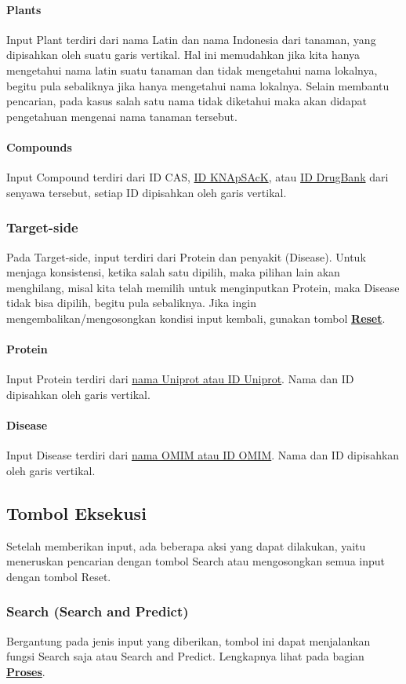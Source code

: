 			\paragraph{Plants}
			Input Plant terdiri dari nama Latin dan nama Indonesia dari tanaman, yang dipisahkan oleh suatu garis vertikal. Hal ini memudahkan jika kita hanya mengetahui nama latin suatu tanaman dan tidak mengetahui nama lokalnya, begitu pula sebaliknya jika hanya mengetahui nama lokalnya. Selain membantu pencarian, pada kasus salah satu nama tidak diketahui maka akan didapat pengetahuan mengenai nama tanaman tersebut.
			\paragraph{Compounds}
			Input Compound terdiri dari ID CAS, \hyperref[knapsack]{ID KNApSAcK}, atau \hyperref[drugbank]{ID DrugBank} dari senyawa tersebut, setiap ID dipisahkan oleh garis vertikal. 
		\subsubsection{Target-side} \label{target input}
		Pada Target-side, input terdiri dari Protein dan penyakit (Disease). Untuk menjaga konsistensi, ketika salah satu dipilih, maka pilihan lain akan menghilang, misal kita telah memilih untuk menginputkan Protein, maka Disease tidak bisa dipilih, begitu pula sebaliknya. Jika ingin mengembalikan/mengosongkan kondisi input kembali, gunakan tombol \hyperref[reset]{\textbf{Reset}}.
			\paragraph{Protein}
			Input Protein terdiri dari \hyperref[uniprot]{nama Uniprot atau ID Uniprot}. Nama dan ID dipisahkan oleh garis vertikal.
			\paragraph{Disease}
			Input Disease terdiri dari \hyperref[omim]{nama OMIM atau ID OMIM}. Nama dan ID dipisahkan oleh garis vertikal.

	\subsection{Tombol Eksekusi}
	Setelah memberikan input, ada beberapa aksi yang dapat dilakukan, yaitu meneruskan pencarian dengan tombol Search atau mengosongkan semua input dengan tombol Reset.
		\subsubsection{Search (Search and Predict)} \label{search}
		Bergantung pada jenis input yang diberikan, tombol ini dapat menjalankan fungsi Search saja atau Search and Predict. Lengkapnya lihat pada bagian \hyperref[process]{\textbf{Proses}}.
